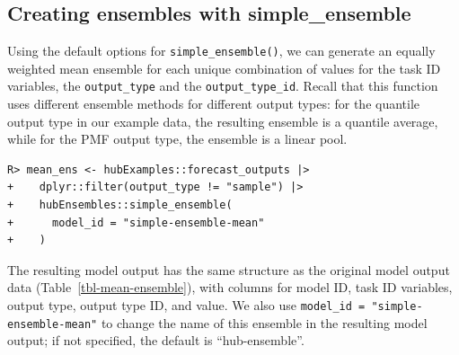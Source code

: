 \documentclass[
  article,
  shortnames,
  notitle]{jss}
\begin{document}
\newpage

\subsection{Creating ensembles with
simple\_ensemble}\label{creating-ensembles-with-simple_ensemble}

Using the default options for \texttt{simple\_ensemble()}, we can
generate an equally weighted mean ensemble for each unique combination
of values for the task ID variables, the \texttt{output\_type} and the
\texttt{output\_type\_id}. Recall that this function uses different
ensemble methods for different output types: for the quantile output
type in our example data, the resulting ensemble is a quantile average,
while for the PMF output type, the ensemble is a linear pool.

\begin{verbatim}
R> mean_ens <- hubExamples::forecast_outputs |>
+    dplyr::filter(output_type != "sample") |>
+    hubEnsembles::simple_ensemble(
+      model_id = "simple-ensemble-mean"
+    )
\end{verbatim}

The resulting model output has the same structure as the original model
output data (Table~\ref{tbl-mean-ensemble}), with columns for model ID,
task ID variables, output type, output type ID, and value. We also use
\texttt{model\_id\ =\ "simple-ensemble-mean"} to change the name of this
ensemble in the resulting model output; if not specified, the default is
``hub-ensemble''.

\newpage
\end{document}
